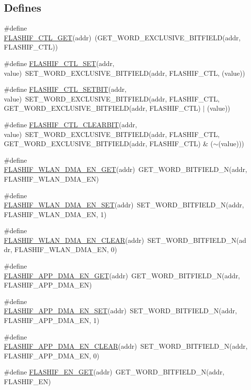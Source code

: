 \subsection*{Defines}
\begin{DoxyCompactItemize}
\item 
\#define \hyperlink{a00551_a5f03768c1f118e98b751d9fc188d30b5}{FLASHIF\_\-CTL\_\-GET}(addr)~(GET\_\-WORD\_\-EXCLUSIVE\_\-BITFIELD(addr, FLASHIF\_\-CTL))
\item 
\#define \hyperlink{a00551_a918e0725f2622cba4bf1771e6a316421}{FLASHIF\_\-CTL\_\-SET}(addr, value)~SET\_\-WORD\_\-EXCLUSIVE\_\-BITFIELD(addr, FLASHIF\_\-CTL, (value))
\item 
\#define \hyperlink{a00551_a7824797c0279b449e89e4fcdf4c6dea7}{FLASHIF\_\-CTL\_\-SETBIT}(addr, value)~SET\_\-WORD\_\-EXCLUSIVE\_\-BITFIELD(addr, FLASHIF\_\-CTL, GET\_\-WORD\_\-EXCLUSIVE\_\-BITFIELD(addr, FLASHIF\_\-CTL) $|$ (value))
\item 
\#define \hyperlink{a00551_a2e46e72be7481437a0a85e28cba1ce75}{FLASHIF\_\-CTL\_\-CLEARBIT}(addr, value)~SET\_\-WORD\_\-EXCLUSIVE\_\-BITFIELD(addr, FLASHIF\_\-CTL, GET\_\-WORD\_\-EXCLUSIVE\_\-BITFIELD(addr, FLASHIF\_\-CTL) \& ($\sim$(value)))
\item 
\#define \hyperlink{a00551_ad8f62eb683b3c29efe22ef3e4982535b}{FLASHIF\_\-WLAN\_\-DMA\_\-EN\_\-GET}(addr)~GET\_\-WORD\_\-BITFIELD\_\-N(addr, FLASHIF\_\-WLAN\_\-DMA\_\-EN)
\item 
\#define \hyperlink{a00551_a399bd96d2db414b6304868713496346b}{FLASHIF\_\-WLAN\_\-DMA\_\-EN\_\-SET}(addr)~SET\_\-WORD\_\-BITFIELD\_\-N(addr, FLASHIF\_\-WLAN\_\-DMA\_\-EN, 1)
\item 
\#define \hyperlink{a00551_ade791f9e1c59f77140ee021d739d915b}{FLASHIF\_\-WLAN\_\-DMA\_\-EN\_\-CLEAR}(addr)~SET\_\-WORD\_\-BITFIELD\_\-N(addr, FLASHIF\_\-WLAN\_\-DMA\_\-EN, 0)
\item 
\#define \hyperlink{a00551_a8ff3fb75dbfbe1afe14b5ff142c100a0}{FLASHIF\_\-APP\_\-DMA\_\-EN\_\-GET}(addr)~GET\_\-WORD\_\-BITFIELD\_\-N(addr, FLASHIF\_\-APP\_\-DMA\_\-EN)
\item 
\#define \hyperlink{a00551_abc8b974f7373e0021a68aa7cbd53ce5e}{FLASHIF\_\-APP\_\-DMA\_\-EN\_\-SET}(addr)~SET\_\-WORD\_\-BITFIELD\_\-N(addr, FLASHIF\_\-APP\_\-DMA\_\-EN, 1)
\item 
\#define \hyperlink{a00551_a32dadb4a7b93f392c70ec5312eba74cc}{FLASHIF\_\-APP\_\-DMA\_\-EN\_\-CLEAR}(addr)~SET\_\-WORD\_\-BITFIELD\_\-N(addr, FLASHIF\_\-APP\_\-DMA\_\-EN, 0)
\item 
\#define \hyperlink{a00551_aaa7ec868b98780593657e75890989422}{FLASHIF\_\-EN\_\-GET}(addr)~GET\_\-WORD\_\-BITFIELD\_\-N(addr, FLASHIF\_\-EN)

\end{DoxyCompactItemize}
